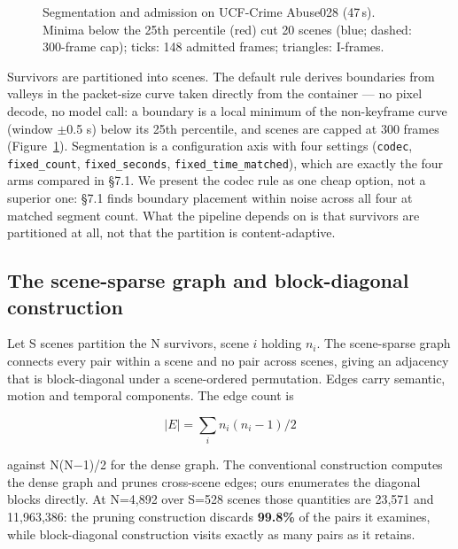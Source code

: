 \documentclass[sigconf,review,anonymous]{acmart}
\begin{document}
\begin{figure}[t]
\caption{Segmentation and admission on UCF-Crime Abuse028 (47\,s). Minima below the 25th percentile (red) cut 20 scenes (blue; dashed: 300-frame cap); ticks: 148 admitted frames; triangles: I-frames.}
\label{fig:valleys}
\end{figure}

Survivors are partitioned into scenes. The default rule derives boundaries from valleys in
the packet-size curve taken directly from the container --- no pixel decode, no model call: a
boundary is a local minimum of the non-keyframe curve (window \ensuremath{\pm}0.5 s) below its 25th
percentile, and scenes are capped at 300 frames (Figure~\ref{fig:valleys}).
Segmentation is a configuration axis with four settings (\texttt{codec}, \texttt{fixed\_count},
\texttt{fixed\_seconds}, \texttt{fixed\_time\_matched}), which are exactly the four arms compared in §7.1. We
present the codec rule as one cheap option, not a superior one: §7.1 finds boundary placement
within noise across all four at matched segment count. What the pipeline depends on is that
survivors are partitioned at all, not that the partition is content-adaptive.

\subsection{The scene-sparse graph and block-diagonal construction}

Let S scenes partition the N survivors, scene \(i\) holding \(n_i\). The scene-sparse graph
connects every pair within a scene and no pair across scenes, giving an adjacency that is
block-diagonal under a scene-ordered permutation. Edges carry semantic, motion and temporal
components. The edge count is

\[|E| = \sum_i n_i(n_i-1)/2\]

against N(N\ensuremath{-}1)/2 for the dense graph. The conventional construction computes the dense graph
and prunes cross-scene edges; ours enumerates the diagonal blocks directly. At N=4,892 over
S=528 scenes those quantities are 23,571 and 11,963,386: the pruning construction discards
\textbf{99.8\%} of the pairs it examines, while block-diagonal construction visits exactly as many
pairs as it retains.
\end{document}
